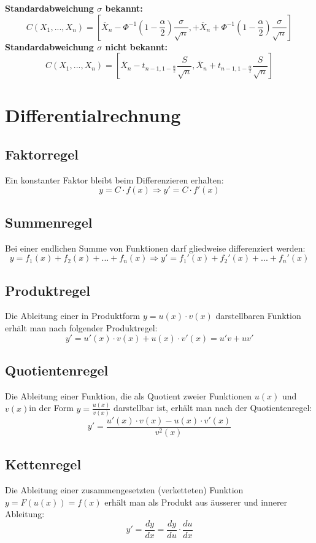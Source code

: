 \documentclass[10pt,a4paper,twocolumn]{article}
\begin{document}
\textbf{Standardabweichung $\sigma$ bekannt:}
\[
C(X_1,...,X_n)=\left[\overline{X}_n-\Phi^{-1}(1-\frac{\alpha}{2})\frac{\sigma}{\sqrt{n}},
+\overline{X}_n+\Phi^{-1}(1-\frac{\alpha}{2})\frac{\sigma}{\sqrt{n}}\right]
\]
\textbf{Standardabweichung $\sigma$ nicht bekannt:}
\[
C(X_1,...,X_n)=\left[\overline{X}_n-t_{n-1,1-\frac{\alpha}{2}}\frac{S}{\sqrt{n}},
\overline{X}_n+t_{n-1,1-\frac{\alpha}{2}}\frac{S}{\sqrt{n}}\right]
\]

\section{Differentialrechnung}

\subsection{Faktorregel}
Ein konstanter Faktor bleibt beim Differenzieren erhalten:
\[
y=C\cdot f(x)\Rightarrow y'=C\cdot f'(x)
\]

\subsection{Summenregel}
Bei einer endlichen Summe von Funktionen darf gliedweise differenziert werden:
\[
y=f_1(x)+f_2(x)+...+f_n(x)\Rightarrow y'=f_1'(x)+f_2'(x)+...+f_n'(x)
\]

\subsection{Produktregel}
Die Ableitung einer in Produktform $y=u(x)\cdot v(x)$ darstellbaren Funktion erhält man nach folgender Produktregel:
\[
y'=u'(x)\cdot v(x)+u(x)\cdot v'(x)=u'v+uv'
\]

\subsection{Quotientenregel}
Die Ableitung einer Funktion, die als Quotient zweier Funktionen $u(x)$ und $v(x)$in der Form $y=\frac{u(x)}{v(x)}$ darstellbar ist, erhält man nach der Quotientenregel:
\[
y'=\frac{u'(x)\cdot v(x)-u(x)\cdot v'(x)}{v^2(x)}
\]

\subsection{Kettenregel}
Die Ableitung einer zusammengesetzten (verketteten) Funktion $y=F(u(x))=f(x)$ erhält man als Produkt aus äusserer und innerer Ableitung:
\[
y'=\frac{dy}{dx}=\frac{dy}{du}\cdot \frac{du}{dx}
\]
\end{document}
